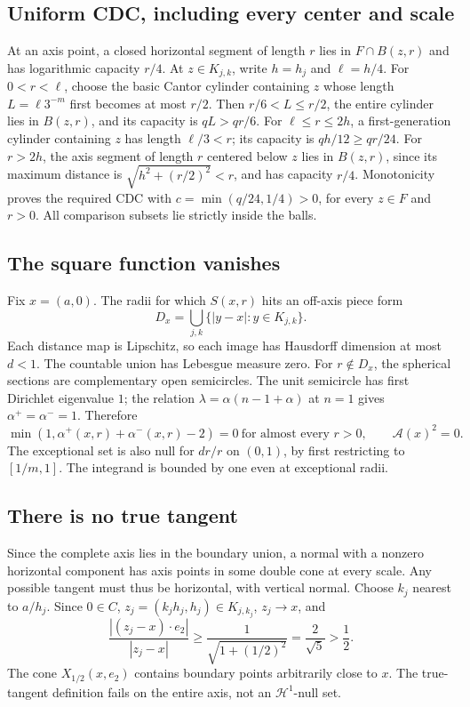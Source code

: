 \documentclass[10pt]{article}
\begin{document}
\subsection*{Uniform CDC, including every center and scale}
At an axis point, a closed horizontal segment of length \(r\) lies in \(F\cap B(z,r)\) and has logarithmic capacity \(r/4\). At \(z\in K_{j,k}\), write \(h=h_j\) and \(\ell=h/4\). For \(0<r<\ell\), choose the basic Cantor cylinder containing \(z\) whose length \(L=\ell3^{-m}\) first becomes at most \(r/2\). Then \(r/6<L\le r/2\), the entire cylinder lies in \(B(z,r)\), and its capacity is \(qL>qr/6\). For \(\ell\le r\le2h\), a first-generation cylinder containing \(z\) has length \(\ell/3<r\); its capacity is \(q h/12\ge qr/24\). For \(r>2h\), the axis segment of length \(r\) centered below \(z\) lies in \(B(z,r)\), since its maximum distance is \(\sqrt{h^2+(r/2)^2}<r\), and has capacity \(r/4\). Monotonicity proves the required CDC with \(c=\min(q/24,1/4)>0\), for every \(z\in F\) and \(r>0\). All comparison subsets lie strictly inside the balls.\par
\subsection*{The square function vanishes}
Fix \(x=(a,0)\). The radii for which \(S(x,r)\) hits an off-axis piece form \[D_x=\bigcup_{j,k}\{|y-x|:y\in K_{j,k}\}.\] Each distance map is Lipschitz, so each image has Hausdorff dimension at most \(d<1\). The countable union has Lebesgue measure zero. For \(r\notin D_x\), the spherical sections are complementary open semicircles. The unit semicircle has first Dirichlet eigenvalue \(1\); the relation \(\lambda=\alpha(n-1+\alpha)\) at \(n=1\) gives \(\alpha^+=\alpha^-=1\). Therefore \[\min(1,\alpha^+(x,r)+\alpha^-(x,r)-2)=0
 \ \text{for almost every }r>0,\qquad \mathcal A(x)^2=0.\] The exceptional set is also null for \(dr/r\) on \((0,1)\), by first restricting to \([1/m,1]\). The integrand is bounded by one even at exceptional radii.\par
\subsection*{There is no true tangent}
Since the complete axis lies in the boundary union, a normal with a nonzero horizontal component has axis points in some double cone at every scale. Any possible tangent must thus be horizontal, with vertical normal. Choose \(k_j\) nearest to \(a/h_j\). Since \(0\in C\), \(z_j=(k_jh_j,h_j)\in K_{j,k_j}\), \(z_j\to x\), and \[\frac{|(z_j-x)\cdot e_2|}{|z_j-x|}
 \ge\frac1{\sqrt{1+(1/2)^2}}=\frac2{\sqrt5}>\frac12.\] The cone \(X_{1/2}(x,e_2)\) contains boundary points arbitrarily close to \(x\). The true-tangent definition fails on the entire axis, not an \(\mathcal H^1\)-null set.\par
\end{document}
